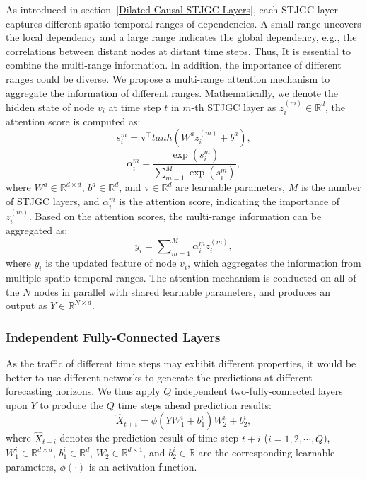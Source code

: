 \documentclass[10pt,journal,compsoc]{IEEEtran}
\begin{document}
As introduced in section~\ref{Dilated Causal STJGC Layers}, each STJGC layer captures different spatio-temporal ranges of dependencies. A small range uncovers the local dependency and a large range indicates the global dependency, e.g., the correlations between distant nodes at distant time steps. Thus, It is essential to combine the multi-range information. In addition, the importance of different ranges could be diverse. We propose a multi-range attention mechanism to aggregate the information of different ranges. Mathematically, we denote the hidden state of node $ v_i $ at time step $ t $ in $ m $-th STJGC layer as $ z_i^{(m)} \in \mathbb{R}^{d} $, the attention score is computed as:
%
\begin{equation}
s_i^{m}=\mathrm{v}^\top tanh(W^az_i^{(m)}+b^a)
\label{eq15},
\end{equation}
%
\begin{equation}
\alpha_i^m=\frac{\exp(s_i^m)}{\sum_{m=1}^{M}\exp(s_i^{m})}
\label{eq16},
\end{equation}
% 
where $ W^a \in \mathbb{R}^{d \times d} $, $ b^a \in \mathbb{R}^{d} $, and $ \mathrm{v} \in \mathbb{R}^{d} $ are learnable parameters, $ M $ is the number of STJGC layers, and $ \alpha_i^m $ is the attention score, indicating the importance of $ z_i^{(m)} $. Based on the attention scores, the multi-range information can be aggregated as:
%
\begin{equation}
y_i=\sum\nolimits_{m=1}^{M}\alpha_i^mz_i^{(m)}
\label{eq17},
\end{equation}
% 
where $ y_i $ is the updated feature of node $ v_i $, which aggregates the information from multiple spatio-temporal ranges. The attention mechanism is conducted on all of the $ N $ nodes in parallel with shared learnable parameters, and produces an output as $ Y \in \mathbb{R}^{N \times d} $. 

\subsubsection{Independent Fully-Connected Layers} 

As the traffic of different time steps may exhibit different properties, it would be better to use different networks to generate the predictions at different forecasting horizons. We thus apply $ Q $ independent two-fully-connected layers upon $ Y $ to produce the $ Q $ time steps ahead prediction results:
%
\begin{equation}
\hat{X}_{t+i} = \phi(YW_1^i+b_1^i)W_2^i+b_2^i
\label{eq18},
\end{equation}
% 
where $ \hat{X}_{t+i} $ denotes the prediction result of time step $ t + i $ ($ i=1,2,\cdots,Q $), $ W_1^i \in \mathbb{R}^{d \times d} $, $ b_1^i \in \mathbb{R}^{d} $, $ W_2^i \in \mathbb{R}^{d \times 1} $, and $ b_2^i \in \mathbb{R} $ are the corresponding learnable parameters, $ \phi(\cdot) $ is an activation function.
\end{document}
